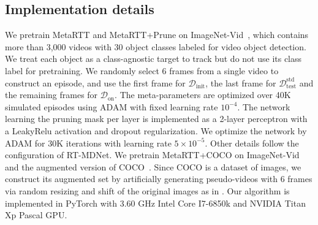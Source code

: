 \documentclass[letterpaper]{article} %
\def \datainit{\mathcal{D}_\text{init}}
\def \dataonline{\mathcal{D}_\text{on}}
\def \dataval{\mathcal{D}_\text{test}}
\begin{document}
\subsection{Implementation details}
We pretrain MetaRTT and MetaRTT+Prune on ImageNet-Vid~\cite{russakovsky2015imagenet}, which contains more than 3,000 videos with 30 object classes labeled for video object detection.
We treat each object as a class-agnostic target to track but do not use its class label for pretraining.
We randomly select 6 frames from a single video to construct an episode, and use the first frame for $\datainit$, the last frame for $\dataval^\mathrm{std}$ and the remaining frames for $\dataonline$.
The meta-parameters are optimized over 40K simulated episodes using ADAM with fixed learning rate $10^{-4}$.
The network learning the pruning mask per layer is implemented as a 2-layer perceptron with a LeakyRelu activation and dropout regularization.
We optimize the network by ADAM for 30K iterations with learning rate $5 \times 10^{-5}$.
Other details follow the configuration of RT-MDNet.
We pretrain MetaRTT+COCO on ImageNet-Vid and the augmented version of COCO~\cite{lin2014microsoft}.
Since COCO is a dataset of images, we construct its augmented set by artificially generating pseudo-videos with 6 frames via random resizing and shift of the original images as in \cite{zheng2018distractor}.
Our algorithm is implemented in PyTorch with 3.60 GHz Intel Core I7-6850k and NVIDIA Titan Xp Pascal GPU.

\end{document}
